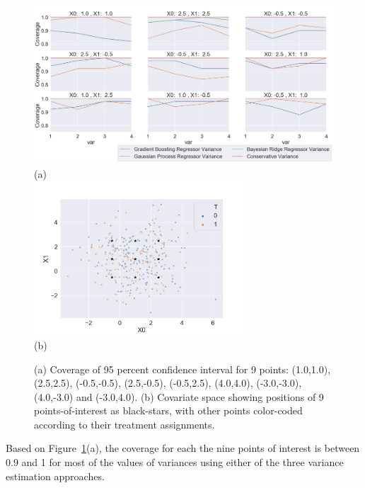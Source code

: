 \begin{figure}
    \centering
    \includegraphics[width=\textwidth]{Figures/coverage.png}\\(a)\\
    \includegraphics[width=0.7\textwidth]{Figures/coverage_space.png}\\(b)
    \caption{(a) Coverage of 95 percent confidence interval for 9 points: (1.0,1.0), (2.5,2.5), (-0.5,-0.5), (2.5,-0.5), (-0.5,2.5), (4.0,4.0), (-3.0,-3.0), (4.0,-3.0) and (-3.0,4.0). (b) Covariate space showing positions of 9 points-of-interest as black-stars, with other points color-coded according to their treatment assignments.}
    \label{fig:Coverage}
\end{figure}

Based on Figure~\ref{fig:Coverage}(a), the coverage for each the nine points of interest is between 0.9 and 1 for most of the values of variances using either of the three variance estimation approaches.

